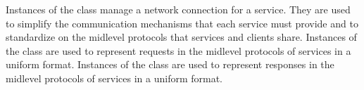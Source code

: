 Instances of the  class manage a
\yarp{} network connection for a service.
They are used to simplify the communication mechanisms that each service must provide and
to standardize on the mid\longDash{}level protocols that \mplusm{} services and clients
share.
Instances of the  class
are used to represent requests in the mid\longDash{}level protocols of \mplusm{} services
in a uniform format.
Instances of the 
class are used to represent responses in the mid\longDash{}level protocols of \mplusm{}
services in a uniform format.
\primaryEnd{}
